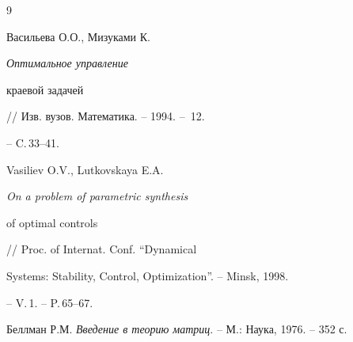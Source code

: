 \begin {thebibliography}{9}







Васильева О.О., Мизуками К. {\em Оптимальное управление 


краевой задачей} // Изв. вузов. Математика. -- 1994. -- \No\,12.


-- C.\,33--41.




Vasiliev O.V., Lutkovskaya E.A. {\em On a problem of parametric synthesis 


of optimal controls} // Proc. of Internat. Conf. ``Dynamical


Systems: Stability, Control, Optimization''. -- Minsk, 1998.


-- V.\,1. -- P.\,65--67.




Беллман Р.М. {\em Введение в теорию матриц}. -- М.: Наука, 1976. -- 352 с.





\end{thebibliography}





\vskip 2cm












\label{end}















